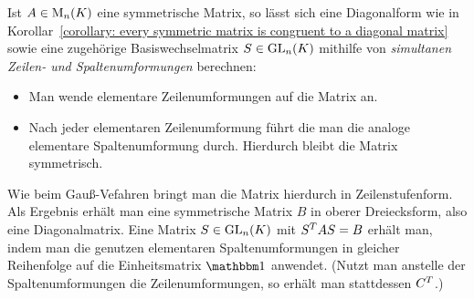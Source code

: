 Ist $A \in \operatorname{M}_{n}(K)$ eine symmetrische Matrix, so lässt sich eine Diagonalform wie in Korollar~\ref{corollary: every symmetric matrix is congruent to a diagonal matrix} sowie eine zugehörige Basiswechselmatrix $S \in \operatorname{GL}_{n}(K)$ mithilfe von \emph{simultanen Zeilen- und Spaltenumformungen} berechnen:
\begin{itemize}
  \item
    Man wende elementare Zeilenumformungen auf die Matrix an.
  \item
    Nach jeder elementaren Zeilenumformung führt die man die analoge elementare Spaltenumformung durch.
    Hierdurch bleibt die Matrix symmetrisch.
\end{itemize}
Wie beim Gauß-Vefahren bringt man die Matrix hierdurch in Zeilenstufenform.
Als Ergebnis erhält man eine symmetrische Matrix $B$ in oberer Dreiecksform, also eine Diagonalmatrix.
Eine Matrix $S \in \operatorname{GL}_{n}(K)$ mit $S^T A S = B$ erhält man, indem man die genutzen elementaren Spaltenumformungen in gleicher Reihenfolge auf die Einheitsmatrix $\Id$ anwendet.
(Nutzt man anstelle der Spaltenumformungen die Zeilenumformungen, so erhält man stattdessen $C^T$.)

